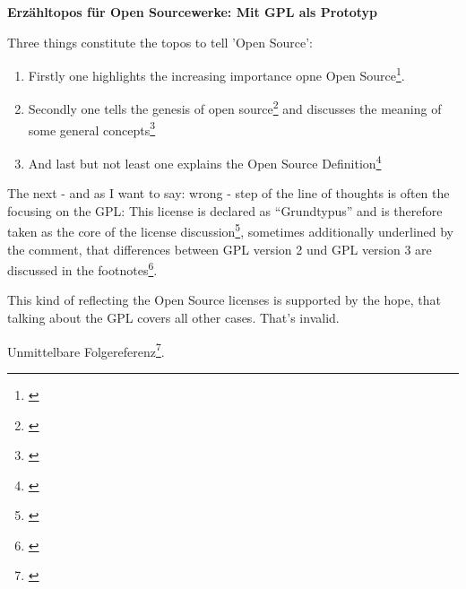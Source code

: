 %
%
%
%

%



\textbf{Erzähltopos für Open Sourcewerke: Mit GPL als Prototyp}

Three things constitute the topos to tell 'Open Source':
\begin{enumerate}
  \item Firstly  one highlights the increasing importance opne Open
  Source\footnote{\cite[cf.][1ff]{Oberhem2008a}}.
  \item Secondly one tells the genesis of open
  source\footnote{\cite[cf.][9]{Oberhem2008a}} and discusses the meaning of some
  general concepts\footnote{\cite[cf.][6ff and 17ff]{Oberhem2008a}}
  \item And last but not least one explains the Open Source
  Definition\footnote{\cite[cf.][10ff]{Oberhem2008a}}
\end{enumerate}

The next - and as I want to say: wrong - step of the line of thoughts is often
the focusing on the GPL: This license is declared as \enquote{Grundtypus}
and is therefore taken as the core of the license
discussion\footnote{\cite[cf.][33]{Oberhem2008a}}, sometimes additionally
underlined by the comment, that differences between GPL version 2 und GPL
version 3 are discussed in the footnotes\footnote{\cite[cf.][34]{Oberhem2008a}}.

This kind of reflecting the Open Source licenses is supported by the hope, that
talking about the GPL covers all other cases. That's invalid.

Unmittelbare Folgereferenz\footnote{\cite[cf.][S.2]{Oberhem2008a}}.


%
